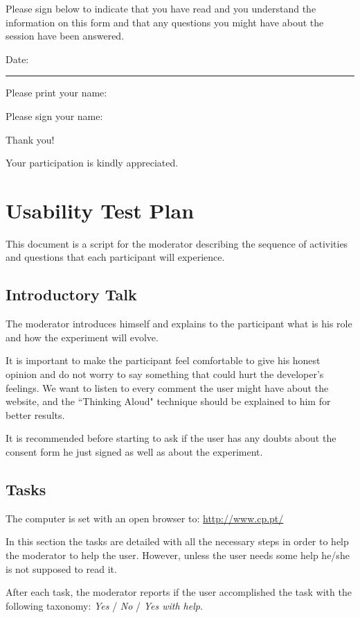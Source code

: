 \documentclass[a4paper]{article}
\begin{document}
Please sign below to indicate that you have read and you understand the information on this form and that any questions you might have about the session have been answered. 

Date: \rule{2cm}{0.4pt} 

Please print your name: \hrulefill

Please sign your name: \hrulefill


Thank you!

Your participation is kindly appreciated.


\section{Usability Test Plan}
\label{sec:usabilityTestPlan}
This document is a script for the moderator describing the sequence of activities and questions that each participant will experience.

\subsection{Introductory Talk}

The moderator introduces himself and explains to the participant what is his role and how the experiment will evolve.

It is important to make the participant feel comfortable to give his honest opinion and do not worry to say something that could hurt the developer's feelings. We want to listen to every comment the user might have about the website, and the ``Thinking Aloud" technique should be explained to him for better results.

It is recommended before starting to ask if the user has any doubts about the consent form he just signed as well as about the experiment.
 
\subsection{Tasks}

The computer is set with an open browser to: \url{http://www.cp.pt/}

In this section the tasks are detailed with all the necessary steps in order to help the moderator to help the user. However, unless the user needs some help he/she is not supposed to read it.

After each task, the moderator reports if the user accomplished the task with the following taxonomy: \emph{Yes} / \emph{No} / \emph{Yes with help}.
\end{document}
